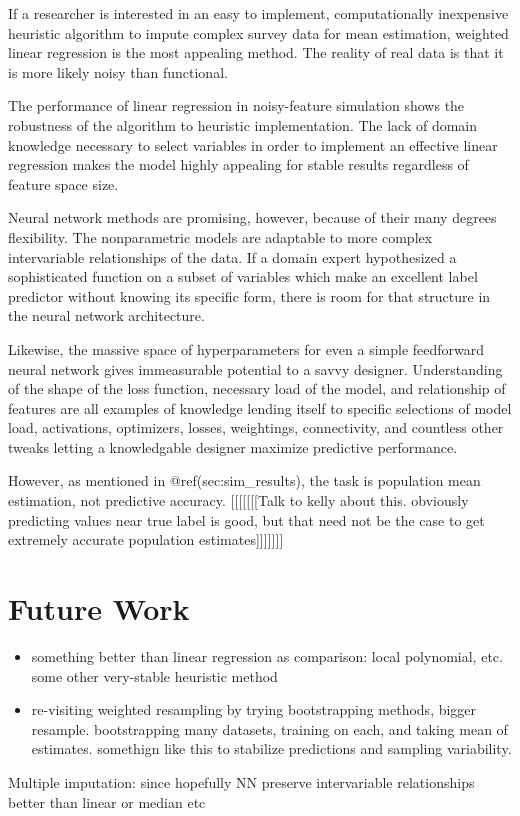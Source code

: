 \documentclass[12pt,twoside]{reedthesis}
\begin{document}
If a researcher is interested in an easy to implement, computationally
inexpensive heuristic algorithm to impute complex survey data for mean
estimation, weighted linear regression is the most appealing method. The
reality of real data is that it is more likely noisy than functional.

The performance of linear regression in noisy-feature simulation shows
the robustness of the algorithm to heuristic implementation. The lack of
domain knowledge necessary to select variables in order to implement an
effective linear regression makes the model highly appealing for stable
results regardless of feature space size.

Neural network methods are promising, however, because of their many
degrees flexibility. The nonparametric models are adaptable to more
complex intervariable relationships of the data. If a domain expert
hypothesized a sophisticated function on a subset of variables which
make an excellent label predictor without knowing its specific form,
there is room for that structure in the neural network architecture.

Likewise, the massive space of hyperparameters for even a simple
feedforward neural network gives immeasurable potential to a savvy
designer. Understanding of the shape of the loss function, necessary
load of the model, and relationship of features are all examples of
knowledge lending itself to specific selections of model load,
activations, optimizers, losses, weightings, connectivity, and countless
other tweaks letting a knowledgable designer maximize predictive
performance.

However, as mentioned in @ref(sec:sim\_results), the task is population
mean estimation, not predictive accuracy. {[}{[}{[}{[}{[}{[}{[}Talk to
kelly about this. obviously predicting values near true label is good,
but that need not be the case to get extremely accurate population
estimates{]}{]}{]}{]}{]}{]}{]}

\section{Future Work}\label{future-work}
\begin{itemize}
\item
  something better than linear regression as comparison: local
  polynomial, etc. some other very-stable heuristic method
\item
  re-visiting weighted resampling by trying bootstrapping methods,
  bigger resample. bootstrapping many datasets, training on each, and
  taking mean of estimates. somethign like this to stabilize predictions
  and sampling variability.
\end{itemize}
Multiple imputation: since hopefully NN preserve intervariable
relationships better than linear or median etc
\end{document}
